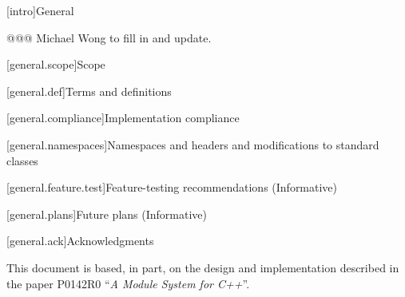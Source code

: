 
[intro]{General}

@@@ Michael Wong to fill in and update.

[general.scope]{Scope}

[general.def]{Terms and definitions}

[general.compliance]{Implementation compliance}

[general.namespaces]{Namespaces and headers and modifications to standard classes}

[general.feature.test]{Feature-testing recommendations (Informative)}

[general.plans]{Future plans (Informative)}

[general.ack]{Acknowledgments}


\pnum
This document is based, in part, on the design and implementation
described in the paper P0142R0 ``\emph{A Module System for C++}''.
